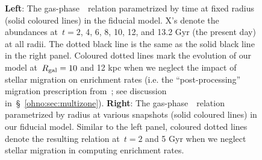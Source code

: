 \begin{figure}
\caption{
\textbf{Left}: The gas-phase~\ohno~relation parametrized by time at
fixed radius (solid coloured lines) in the fiducial model. X's denote the
abundances at~$t = 2$, 4, 6, 8, 10, 12, and 13.2 Gyr (the present day) at all
radii.
The dotted black line is the same as the solid black line in the right panel.
Coloured dotted lines mark the evolution of our model at~$R_\text{gal} = 10$ and 12
kpc when we neglect the impact of stellar migration on enrichment rates (i.e.
the ``post-processing'' migration prescription from~\citealp{Johnson2021}; see
discussion in~\S~\ref{ohno:sec:multizone}).
\textbf{Right}: The gas-phase~\ohno~relation parametrized by radius at
various snapshots (solid coloured lines) in our fiducial model.
Similar to the left panel, coloured dotted lines denote the resulting relation
at~$t = 2$ and 5 Gyr when we neglect stellar migration in computing enrichment
rates.
}
\label{ohno:fig:no_oh_timeevol}
\end{figure}


